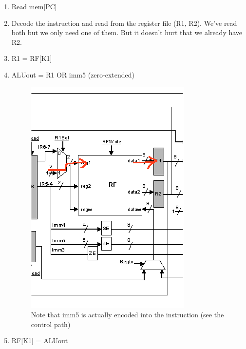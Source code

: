 \documentclass[../notes.tex]{subfiles}
\begin{document}
\begin{enumerate}
	\item Read mem[PC]
	\item Decode the instruction and read from the register file (R1, R2). We've read both but we only need one of them. But it doesn't hurt that we already have R2.
	\item R1 = RF[K1]
	\item ALUout = R1 OR imm5 (zero-extended)

		\begin{figure}[H]
			\centering
			\includegraphics[width=0.8\linewidth]{img/image_2022-11-03-13-49-54.png}
			\caption{Note that imm5 is actually encoded into the instruction (see the control path)}
		\end{figure}
	\item RF[K1] = ALUout


\end{enumerate}
\end{document}
